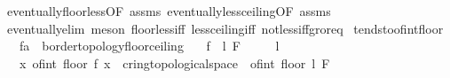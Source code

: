 \begin{isabellebody}
%
\isatagproof
{}\isamarkupfalse%
\ eventually{\isacharunderscore}{\kern0pt}floor{\isacharunderscore}{\kern0pt}less{\isacharbrackleft}{\kern0pt}OF\ assms{\isacharbrackright}{\kern0pt}\ eventually{\isacharunderscore}{\kern0pt}less{\isacharunderscore}{\kern0pt}ceiling{\isacharbrackleft}{\kern0pt}OF\ assms{\isacharbrackright}{\kern0pt}\isanewline
\ \ \isamarkupfalse%
\ eventually{\isacharunderscore}{\kern0pt}elim\ {\isacharparenleft}{\kern0pt}meson\ floor{\isacharunderscore}{\kern0pt}less{\isacharunderscore}{\kern0pt}iff\ less{\isacharunderscore}{\kern0pt}ceiling{\isacharunderscore}{\kern0pt}iff\ not{\isacharunderscore}{\kern0pt}less{\isacharunderscore}{\kern0pt}iff{\isacharunderscore}{\kern0pt}gr{\isacharunderscore}{\kern0pt}or{\isacharunderscore}{\kern0pt}eq{\isacharparenright}{\kern0pt}%
\endisatagproof
{\isafoldproof}%
%
\isadelimproof
\isanewline
%
\endisadelimproof
\isanewline
{}\isamarkupfalse%
\ tendsto{\isacharunderscore}{\kern0pt}of{\isacharunderscore}{\kern0pt}int{\isacharunderscore}{\kern0pt}floor{\isacharcolon}{\kern0pt}\isanewline
\ \ \ f{\isacharcolon}{\kern0pt}{\isacharcolon}{\kern0pt}{\isachardoublequoteopen}{\isacharprime}{\kern0pt}a\ {\isasymRightarrow}\ {\isacharprime}{\kern0pt}b{\isacharcolon}{\kern0pt}{\isacharcolon}{\kern0pt}{\isacharbraceleft}{\kern0pt}order{\isacharunderscore}{\kern0pt}topology{\isacharcomma}{\kern0pt}floor{\isacharunderscore}{\kern0pt}ceiling{\isacharbraceright}{\kern0pt}{\isachardoublequoteclose}\isanewline
\ \ \ {\isachardoublequoteopen}{\isacharparenleft}{\kern0pt}f\ {\isasymlonglongrightarrow}\ l{\isacharparenright}{\kern0pt}\ F{\isachardoublequoteclose}\isanewline
\ \ \ \ \ {\isachardoublequoteopen}l\ {\isasymnotin}\ {\isasymint}{\isachardoublequoteclose}\isanewline
\ \ \ {\isachardoublequoteopen}{\isacharparenleft}{\kern0pt}{\isacharparenleft}{\kern0pt}{\isasymlambda}x{\isachardot}{\kern0pt}\ of{\isacharunderscore}{\kern0pt}int\ {\isacharparenleft}{\kern0pt}floor\ {\isacharparenleft}{\kern0pt}f\ x{\isacharparenright}{\kern0pt}{\isacharparenright}{\kern0pt}\ {\isacharcolon}{\kern0pt}{\isacharcolon}{\kern0pt}\ {\isacharprime}{\kern0pt}c{\isacharcolon}{\kern0pt}{\isacharcolon}{\kern0pt}{\isacharbraceleft}{\kern0pt}ring{\isacharunderscore}{\kern0pt}{}{\isacharcomma}{\kern0pt}topological{\isacharunderscore}{\kern0pt}space{\isacharbraceright}{\kern0pt}{\isacharparenright}{\kern0pt}\ {\isasymlonglongrightarrow}\ of{\isacharunderscore}{\kern0pt}int\ {\isacharparenleft}{\kern0pt}floor\ l{\isacharparenright}{\kern0pt}{\isacharparenright}{\kern0pt}\ F{\isachardoublequoteclose}\isanewline

\end{isabellebody}
